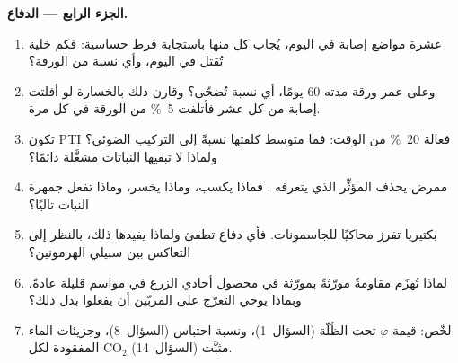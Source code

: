 \begin{problem}
\medskip
\noindent\textbf{الجزء الرابع --- الدفاع.}
\begin{enumerate}[resume]
  \item عشرة مواضع إصابة في اليوم، يُجاب كل منها باستجابة فرط
        حساسية: فكم خلية تُقتل في اليوم، وأي نسبة من الورقة؟
  \item وعلى عمر ورقة مدته 60 يومًا، أي نسبة تُضحّى؟ وقارن
        ذلك بالخسارة لو أفلتت إصابة من كل عشر فأتلفت
        \qty{5}{\%} من الورقة في كل مرة.
  \item تكون PTI فعالة \qty{20}{\%} من الوقت: فما متوسط كلفتها
        نسبةً إلى التركيب الضوئي؟ ولماذا لا تبقيها النباتات
        مشغَّلة دائمًا؟
  \item ممرض يحذف المؤثِّر الذي يتعرفه . فماذا يكسب،
        وماذا يخسر، وماذا تفعل جمهرة النبات تاليًا؟
  \item بكتيريا تفرز محاكيًا للجاسمونات. فأي دفاع تطفئ ولماذا
        يفيدها ذلك، بالنظر إلى التعاكس بين سبيلي الهرمونين؟
  \item لماذا تُهزَم مقاومةٌ مورّثةً بمورّثة في محصول أحادي
        الزرع في مواسم قليلة عادةً، وبماذا يوحي التعرّج على
        المربّين أن يفعلوا بدل ذلك؟
  \item لخّص: قيمة $\varphi$ تحت الظُلّة (السؤال~1)، ونسبة
        احتباس  (السؤال~8)، وجزيئات الماء المفقودة لكل
        CO$_{2}$ مثبَّت (السؤال~14).
\end{enumerate}
\end{problem}
